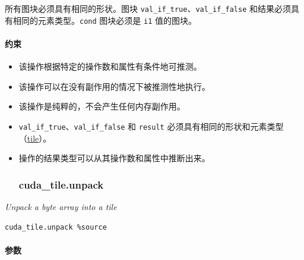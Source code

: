 \documentclass{article}
\begin{document}
所有图块必须具有相同的形状。图块 \texttt{val\_if\_true}、\texttt{val\_if\_false} 和结果必须具有相同的元素类型。\texttt{cond} 图块必须是 \texttt{i1} 值的图块。



\paragraph{约束}

\begin{itemize}
\item 该操作根据特定的操作数和属性有条件地可推测。
\item 该操作可以在没有副作用的情况下被推测性地执行。
\item 该操作是纯粹的，不会产生任何内存副作用。
\item \texttt{val\_if\_true}、\texttt{val\_if\_false} 和 \texttt{result} 必须具有相同的形状和元素类型（\href{https://docs.nvidia.com/cuda/tile-ir/latest/sections/types.html#type-tile}{tile}）。
\item 操作的结果类型可以从其操作数和属性中推断出来。


\subsubsection{cuda\_tile.unpack}

\end{itemize}
\textit{Unpack a byte array into a tile}


\begin{lstlisting}
cuda_tile.unpack %source
\end{lstlisting}

\paragraph{参数}
\end{document}
